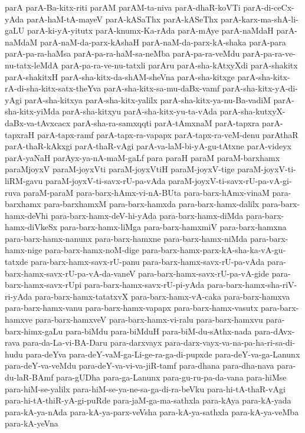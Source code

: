 {parA
parA-Ba-kitx-riti
parAM
parAM-ta-niva
parA-dhaR-koVTi
parA-di-ceCx-yAda
parA-haM-tA-mayeV
parA-kASaThx
parA-kASeThx
parA-karx-ma-shA-li-gaLU
parA-ki-yA-yitutx
parA-knumx-Ka-rAda
parA-mAye
parA-naMdaH
parA-naMdaM
parA-naM-da-parx-kAshaH
parA-naM-da-parx-kA-shaka
parA-para
parA-pa-ra-haMsa
parA-pa-ra-haM-sa-neMba
parA-pa-ra-veMdu
parA-pa-ra-ve-nu-tatx-leMdA
parA-pa-ra-ve-nu-tatxli
parAru
parA-sha-kAtxyXdi
parA-shakitx
parA-shakitxH
parA-sha-kitx-da-shAM-sheVna
parA-sha-kitxge
parA-sha-kitx-rA-di-sha-kitx-satx-theYva
parA-sha-kitx-sa-mu-daBx-vamf
parA-sha-kitx-yA-di-yAgi
parA-sha-kitxya
parA-sha-kitx-yalilx
parA-sha-kitx-ya-nu-Ba-vadiM
parA-sha-kitx-yiMda
parA-sha-kitxyu
parA-sha-kitx-yu-ta-vAda
parA-sha-kutxyX-daBx-va-tAvxcacx
parA-sha-ra-samxqqti
parA-tAmxnaM
parA-tapxra
parA-tapxraH
parA-tapx-ramf
parA-tapx-ra-vapapx
parA-tapx-ra-veM-denu
parAthaR
parA-thaR-kAkxgi
parA-thaR-vAgi
parA-va-laM-bi-yA-gu-tAtxne
parA-videyx
parA-yaNaH
parAyx-ya-nA-maM-gaLf
para
paraH
paraM
paraM-barxhamx
paraMjoyxV
paraM-joyxVti
paraM-joyxVtiH
paraM-joyxV-tige
paraM-joyxV-ti-liRM-gavu
paraM-joyxV-ti-savx-rU-pa-vAda
paraM-joyxV-ti-savx-rU-pa-vA-gi-ruva
paraM-paraM
para-barx-hAmx-vi-nA-BUta
para-barx-hAmx-vinaM
para-barxhamx
para-barxhamxM
para-barx-hamxda
para-barx-hamx-dalilx
para-barx-hamx-deVhi
para-barx-hamx-deV-hi-yAda
para-barx-hamx-diMda
para-barx-hamx-diVkeSx
para-barx-hamx-liMga
para-barx-hamxmiV
para-barx-hamxna
para-barx-hamx-nanunx
para-barx-hamxne
para-barx-hamx-niMda
para-barx-hamx-nige
para-barx-hamx-noM-dige
para-barx-hamx-parx-kA-sha-ka-vA-gu-tatxde
para-barx-hamx-savx-rU-panu
para-barx-hamx-savx-rU-pa-vAda
para-barx-hamx-savx-rU-pa-vA-da-vaneV
para-barx-hamx-savx-rU-pa-vA-gide
para-barx-hamx-savx-rUpi
para-barx-hamx-savx-rU-pi-yAda
para-barx-hamx-sha-riV-ri-yAda
para-barx-hamx-tatatxvX
para-barx-hamx-vA-caka
para-barx-hamxva
para-barx-hamx-vanu
para-barx-hamx-vapapx
para-barx-hamx-vasutx
para-barx-hamxve
para-barx-hamxveV
para-barx-hamx-vi-ralu
para-barx-hamxvu
para-barx-himx-gaLu
para-biMdu
para-biMduH
para-biM-du-sAthx-nada
para-dAvx-rava
para-da-La-vi-BA-Daru
para-darxvayx
para-darx-vayx-va-na-pa-ha-ri-sa-di-hudu
para-deYva
para-deY-vaM-ga-Li-ge-ra-ga-di-pupxde
para-deY-va-ga-Lanunx
para-deY-va-veMdu
para-deY-va-vi-va-jiR-tamf
para-dhana
para-dha-nava
para-du-laR-BAmf
para-gUDha
para-ga-Lanunx
para-gu-ru-pa-da-vana
para-hiMse
para-hiM-se-yalilx
para-hiM-se-ya-ne-sa-ga-di-ra-beVku
para-hi-tA-thaR-vAgi
para-hi-tA-thiR-yA-gi-puRde
para-jaM-ga-ma-sathxla
para-kAya
para-kA-yada
para-kA-ya-nAda
para-kA-ya-parx-veVsha
para-kA-ya-sathxla
para-kA-ya-veMba
para-kA-yeVna
}
